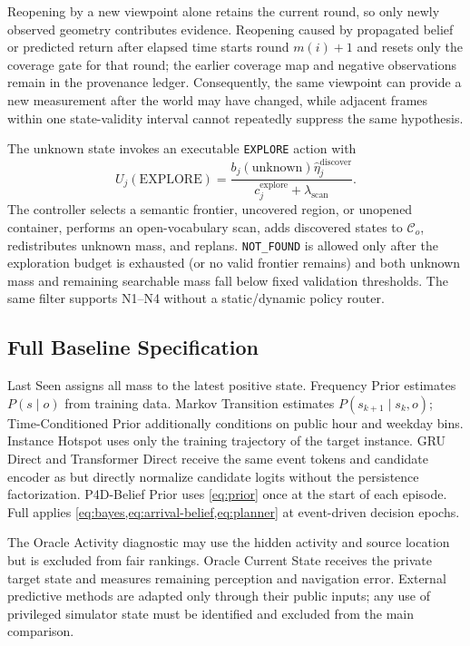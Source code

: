 Reopening by a new viewpoint alone retains the current round, so only newly
observed geometry contributes evidence. Reopening caused by propagated belief or predicted
return after elapsed time starts round $m(i)+1$ and resets only the coverage gate for that round; the earlier coverage map and negative observations remain in
the provenance ledger. Consequently, the same viewpoint can provide a new
measurement after the world may have changed, while adjacent frames within one
state-validity interval cannot repeatedly suppress the same hypothesis.

The $\mathrm{unknown}$ state invokes an executable \texttt{EXPLORE} action with
\begin{equation}
U_j(\mathrm{EXPLORE})=
\frac{b_j(\mathrm{unknown})\widehat\eta_j^{\mathrm{discover}}}
{c_j^{\mathrm{explore}}+\lambda_{\mathrm{scan}}}.
\label{eq:unknown-action}
\end{equation}
The controller selects a semantic frontier, uncovered region, or unopened
container, performs an open-vocabulary scan, adds discovered states to
$\mathcal C_o$, redistributes unknown mass, and replans. \texttt{NOT\_FOUND} is
allowed only after the exploration budget is exhausted (or no valid frontier
remains) and both unknown mass and remaining searchable mass fall below fixed
validation thresholds. The same filter supports N1--N4 without a
static/dynamic policy router.

\subsection{Full Baseline Specification}
\label{app:baselines}

Last Seen assigns all mass to the latest positive state. Frequency Prior estimates $P(s\mid o)$ from training data. Markov Transition estimates $P(s_{k+1}\mid s_k,o)$; Time-Conditioned Prior additionally conditions on public hour and weekday bins. Instance Hotspot uses only the training trajectory of the target instance. GRU Direct and Transformer Direct receive the same event tokens and candidate encoder as \pfdnav{} but directly normalize candidate logits without the persistence factorization. P4D-Belief Prior uses \cref{eq:prior} once at the start of each episode. Full \evolvingworldnav{} applies \cref{eq:bayes,eq:arrival-belief,eq:planner} at event-driven decision epochs.

The Oracle Activity diagnostic may use the hidden activity and source location but is excluded from fair rankings. Oracle Current State receives the private target state and measures remaining perception and navigation error. External predictive methods are adapted only through their public inputs; any use of privileged simulator state must be identified and excluded from the main comparison.

